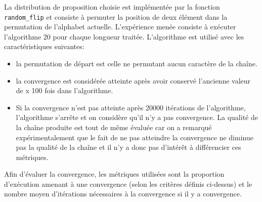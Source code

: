 \documentclass[11pt]{report}
\begin{document}
\subsubsection{}
La distribution de proposition choisie est implémentée par la fonction \texttt{random\_flip} et consiste à permuter la position de deux élément dans la permutation de l'alphabet actuelle. L'expérience menée consiste à exécuter l'algorithme 20 pour chaque longueur traitée. L'algorithme est utilisé avec les caractéristiques suivantes:
\begin{itemize}
\item la permutation de départ est celle ne permutant aucun caractère de la chaîne.
\item la convergence est considérée atteinte après avoir conservé l'ancienne valeur de x 100 fois dans l'algorithme.
\item Si la convergence n'est pas atteinte après 20000 itérations de l'algorithme, l'algorithme s'arrête et on considère qu'il n'y a pas convergence. La qualité de la chaîne produite est tout de même évaluée car on a remarqué expérimentalement que le fait de ne pas atteindre la convergence ne diminue pas la qualité de la chaîne et il n'y a donc pas d'intérêt à différencier ces métriques.
\end{itemize} 
Afin d'évaluer la convergence, les métriques utilisées sont la proportion d'exécution amenant à une convergence (selon les critères définis ci-dessus) et le nombre moyen d'itérations nécessaires à la convergence si il y a convergence.\\
\end{document}
